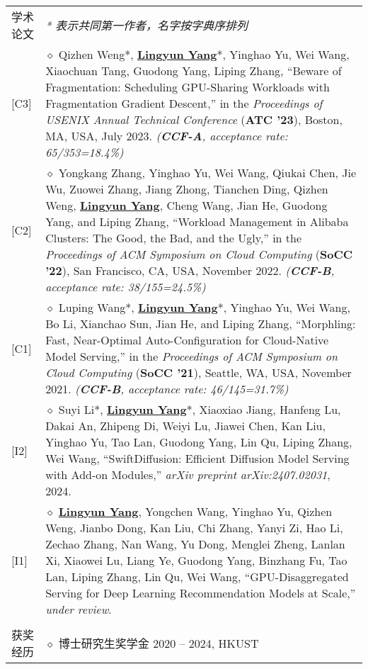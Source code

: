 \documentclass[letterpaper, 10pt]{article}
\begin{document}
\begin{longtable}{p{0.7in}p{6.0in}}
{学术论文}
& \textit{* 表示共同第一作者，名字按字典序排列} \\
\hfill [C3]
& $\diamond$ Qizhen Weng*, \textbf{\underline{Lingyun Yang}}*, Yinghao Yu, Wei Wang, Xiaochuan Tang, Guodong Yang, Liping Zhang, “Beware of Fragmentation: Scheduling GPU-Sharing Workloads with Fragmentation Gradient Descent,” in the \textit{Proceedings of USENIX Annual Technical Conference} (\textbf{ATC '23}), Boston, MA, USA, July 2023. \textit{(\textbf{CCF-A}, acceptance rate: 65/353=18.4\%)} \\
\hfill [C2]
& $\diamond$ Yongkang Zhang, Yinghao Yu, Wei Wang, Qiukai Chen, Jie Wu, Zuowei Zhang, Jiang Zhong, Tianchen Ding, Qizhen Weng, \textbf{\underline{Lingyun Yang}}, Cheng Wang, Jian He, Guodong Yang, and Liping Zhang, “Workload Management in Alibaba Clusters: The Good, the Bad, and the Ugly,” in the \textit{Proceedings of ACM Symposium on Cloud Computing} (\textbf{SoCC '22}), San Francisco, CA, USA, November 2022. \textit{(\textbf{CCF-B}, acceptance rate: 38/155=24.5\%)} \\
\hfill [C1]
& $\diamond$ Luping Wang*, \textbf{\underline{Lingyun Yang}}*, Yinghao Yu, Wei Wang, Bo Li, Xianchao Sun, Jian He, and Liping Zhang, “Morphling: Fast, Near-Optimal Auto-Configuration for Cloud-Native Model Serving,” in the \textit{Proceedings of ACM Symposium on Cloud Computing} (\textbf{SoCC '21}), Seattle, WA, USA, November 2021. \textit{(\textbf{CCF-B}, acceptance rate: 46/145=31.7\%)} \\
\hfill [I2]
& $\diamond$ Suyi Li*, \textbf{\underline{Lingyun Yang}}*, Xiaoxiao Jiang, Hanfeng Lu, Dakai An, Zhipeng Di, Weiyi Lu, Jiawei Chen, Kan Liu, Yinghao Yu, Tao Lan, Guodong Yang, Lin Qu, Liping Zhang, Wei Wang, “SwiftDiffusion: Efficient Diffusion Model Serving with Add-on Modules,” \textit{arXiv preprint arXiv:2407.02031}, 2024. \\
\hfill [I1]
& $\diamond$ \textbf{\underline{Lingyun Yang}}, Yongchen Wang, Yinghao Yu, Qizhen Weng, Jianbo Dong, Kan Liu, Chi Zhang, Yanyi Zi, Hao Li, Zechao Zhang, Nan Wang, Yu Dong, Menglei Zheng, Lanlan Xi, Xiaowei Lu, Liang Ye, Guodong Yang, Binzhang Fu, Tao Lan, Liping Zhang, Lin Qu, Wei Wang, “GPU-Disaggregated Serving for Deep Learning Recommendation Models at Scale,” \textit{under review}. \\
& \\

{获奖经历}
& $\diamond$ 博士研究生奖学金 \hfill 2020 -- 2024, HKUST \\


\end{longtable}
\end{document}
